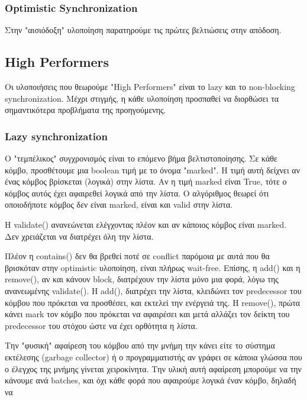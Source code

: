 \documentclass[../final_report.tex]{subfiles}
\begin{document}
\subsubsection*{Optimistic Synchronization}
Στην "αισιόδοξη" υλοποίηση παρατηρούμε τις πρώτες βελτιώσεις στην απόδοση. 




\subsection{High Performers}
Οι υλοποιήσεις που θεωρούμε "High Performers" είναι το lazy και το non-blocking synchronization. Μέχρι στιγμής, η κάθε υλοποίηση προσπαθεί
να διορθώσει τα σημαντικότερα προβλήματα της προηγούμενης. 

\subsubsection{Lazy synchronization}
Ο "τεμπέλικος" συγχρονισμός είναι το επόμενο βήμα βελτιστοποίησης. Σε κάθε κόμβο, προσθέτουμε μια boolean τιμή με το όνομα
"marked". Η τιμή αυτή δείχνει αν ένας κόμβος βρίσκεται (λογικά) στην λίστα. Αν η τιμή marked είναι True, τότε ο κόμβος αυτός
έχει αφαιρεθεί λογικά από την λίστα. Ο αλγόριθμος θεωρεί ότι οποιοδήποτε κόμβος δεν είναι marked, είναι και valid στην λίστα.

Η validate() ανανεώνεται ελέγχοντας πλέον και αν κάποιος κόμβος είναι marked. Δεν χρειάζεται να διατρέχει όλη την λίστα.

Πλέον η contains() δεν θα βρεθεί ποτέ σε conflict παρόμοια με αυτά που θα βρισκόταν στην optimistic υλοποίηση,
είναι πλήρως wait-free. Επίσης, η add() και η remove(), αν και κάνουν block, διατρέχουν την λίστα μόνο μια φορά, λόγω της ανανεωμένης validate().
Η add(), διατρέχει την λίστα, κλειδώνει τον predecessor του κόμβου που πρόκεται να προσθέσει, και εκτελεί την ενέργειά της.
Η remove(), πρώτα κάνει mark τον κόμβο που πρόκεται να αφαιρέσει και μετά αλλάζει τον δείκτη του predecessor του στόχου ώστε να έχει
ορθότητα η λίστα.

Την "φυσική" αφαίρεση του κόμβου από την μνήμη την κάνει είτε το σύστημα εκτέλεσης (garbage collector) ή ο προγραμματιστής αν 
γράφει σε κάποια γλώσσα που ο έλεγχος της μνήμης γίνεται χειροκίνητα. Την υλική αυτή αφαίρεση μπορούμε να την κάνουμε ανά batches,
και όχι κάθε φορά που αφαιρούμε λογικά έναν κόμβο, δηλαδή να 
\end{document}
